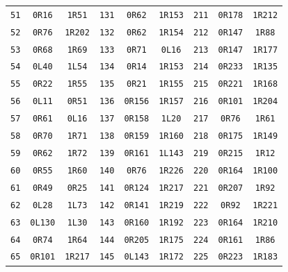 \begin{longtable}{@{}rcc@{\hspace{1.6em}}rcc@{\hspace{1.6em}}rcc@{}}
\texttt{51} & \texttt{0R16} & \texttt{1R51} & \texttt{131} & \texttt{0R62} & \texttt{1R153} & \texttt{211} & \texttt{0R178} & \texttt{1R212}\\
\texttt{52} & \texttt{0R76} & \texttt{1R202} & \texttt{132} & \texttt{0R62} & \texttt{1R154} & \texttt{212} & \texttt{0R147} & \texttt{1R88}\\
\texttt{53} & \texttt{0R68} & \texttt{1R69} & \texttt{133} & \texttt{0R71} & \texttt{0L16} & \texttt{213} & \texttt{0R147} & \texttt{1R177}\\
\texttt{54} & \texttt{0L40} & \texttt{1L54} & \texttt{134} & \texttt{0R14} & \texttt{1R153} & \texttt{214} & \texttt{0R233} & \texttt{1R135}\\
\texttt{55} & \texttt{0R22} & \texttt{1R55} & \texttt{135} & \texttt{0R21} & \texttt{1R155} & \texttt{215} & \texttt{0R221} & \texttt{1R168}\\
\texttt{56} & \texttt{0L11} & \texttt{0R51} & \texttt{136} & \texttt{0R156} & \texttt{1R157} & \texttt{216} & \texttt{0R101} & \texttt{1R204}\\
\texttt{57} & \texttt{0R61} & \texttt{0L16} & \texttt{137} & \texttt{0R158} & \texttt{1L20} & \texttt{217} & \texttt{0R76} & \texttt{1R61}\\
\texttt{58} & \texttt{0R70} & \texttt{1R71} & \texttt{138} & \texttt{0R159} & \texttt{1R160} & \texttt{218} & \texttt{0R175} & \texttt{1R149}\\
\texttt{59} & \texttt{0R62} & \texttt{1R72} & \texttt{139} & \texttt{0R161} & \texttt{1L143} & \texttt{219} & \texttt{0R215} & \texttt{1R12}\\
\texttt{60} & \texttt{0R55} & \texttt{1R60} & \texttt{140} & \texttt{0R76} & \texttt{1R226} & \texttt{220} & \texttt{0R164} & \texttt{1R100}\\
\texttt{61} & \texttt{0R49} & \texttt{0R25} & \texttt{141} & \texttt{0R124} & \texttt{1R217} & \texttt{221} & \texttt{0R207} & \texttt{1R92}\\
\texttt{62} & \texttt{0L28} & \texttt{1L73} & \texttt{142} & \texttt{0R141} & \texttt{1R219} & \texttt{222} & \texttt{0R92} & \texttt{1R221}\\
\texttt{63} & \texttt{0L130} & \texttt{1L30} & \texttt{143} & \texttt{0R160} & \texttt{1R192} & \texttt{223} & \texttt{0R164} & \texttt{1R210}\\
\texttt{64} & \texttt{0R74} & \texttt{1R64} & \texttt{144} & \texttt{0R205} & \texttt{1R175} & \texttt{224} & \texttt{0R161} & \texttt{1R86}\\
\texttt{65} & \texttt{0R101} & \texttt{1R217} & \texttt{145} & \texttt{0L143} & \texttt{1R172} & \texttt{225} & \texttt{0R223} & \texttt{1R183}\\

\end{longtable}
